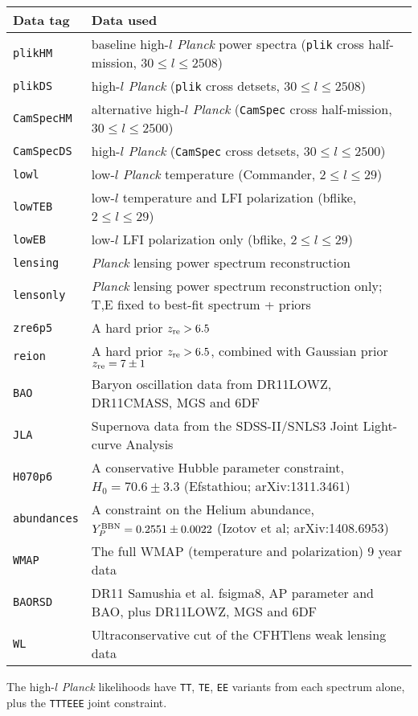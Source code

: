 \begin{tabular} { l   l  }
Data tag & Data used\\
\hline
{\tt plikHM}         & baseline high-$l$ \textit{Planck} power spectra ({\tt plik} cross half-mission, $30\le l\le 2508$) \\
{\tt plikDS}         & high-$l$ \textit{Planck} ({\tt plik} cross detsets, $30\le l\le 2508$) \\
{\tt CamSpecHM}      & alternative high-$l$ \textit{Planck}  ({\tt CamSpec} cross half-mission, $30\le l\le 2500$) \\
{\tt CamSpecDS}      & high-$l$ \textit{Planck} ({\tt CamSpec} cross detsets, $30\le l\le 2500$) \\
{\tt lowl }          & low-$l$ \textit{Planck} temperature (Commander, $2\le l \le 29$)  \\
{\tt lowTEB}         & low-$l$ temperature and LFI polarization (bflike, $2\le l \le 29$)\\
{\tt lowEB}          & low-$l$  LFI polarization only (bflike, $2\le l \le 29$)\\
{\tt lensing}        & \textit{Planck}  lensing power spectrum reconstruction\\
{\tt lensonly}       & \textit{Planck}  lensing power spectrum reconstruction only; T,E fixed to best-fit spectrum + priors\\
{\tt zre6p5}         & A hard prior $z_{\rm re} > 6.5$\\
{\tt reion}          & A hard prior $z_{\rm re} > 6.5$, combined with Gaussian prior $z_{\rm re} = 7\pm 1$\\
{\tt BAO}            & Baryon oscillation data from DR11LOWZ, DR11CMASS, MGS and 6DF \\
{\tt JLA}            & Supernova data from the SDSS-II/SNLS3 Joint Light-curve Analysis \\
{\tt H070p6}         & A conservative Hubble parameter constraint, $H_0 = 70.6\pm 3.3$ (Efstathiou; arXiv:1311.3461) \\
{\tt abundances}     & A constraint on the Helium abundance, $Y_P^{\rm BBN} =0.2551\pm 0.0022$ (Izotov et al; arXiv:1408.6953) \\
{\tt WMAP}           & The full WMAP (temperature and polarization) 9 year data \\
{\tt BAORSD}         & DR11 Samushia et al. fsigma8, AP parameter and BAO, plus DR11LOWZ, MGS and 6DF  \\
{\tt WL}             & Ultraconservative cut of the CFHTlens weak lensing data  \\
\hline
\end{tabular}
\vskip 1cm
The high-$l$ \textit{Planck} likelihoods have {\tt TT}, {\tt TE}, {\tt EE} variants from each spectrum alone, plus the {\tt TTTEEE} joint constraint.


